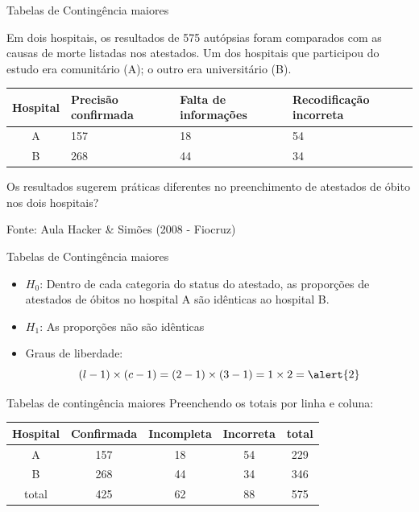 \documentclass{beamer}
\begin{document}
\begin{frame}{Tabelas de Contingência maiores}
  \begin{example}
    Em dois hospitais, os resultados de 575 autópsias
    foram comparados com as causas de morte listadas nos
    atestados. Um dos hospitais que participou do estudo era
    comunitário (A); o outro era universitário (B).

    \begin{tabular}{c|p{2cm}|p{2cm}|p{2cm}}
      Hospital & Precisão confirmada & Falta de informações &
      Recodificação incorreta \\
      \hline
      A & 157 & 18 & 54 \\
      \hline
      B & 268 & 44 & 34 \\
    \end{tabular}

    Os resultados sugerem práticas diferentes no preenchimento de
    atestados de óbito nos dois hospitais?
  \end{example}
  Fonte: Aula Hacker \& Simões (2008 - Fiocruz)
\end{frame}

\begin{frame}{Tabelas de Contingência maiores}
  \begin{itemize}
  \item $H_0$: Dentro de cada categoria do status do atestado, as
    proporções de atestados de óbitos no hospital A são idênticas ao
    hospital B.
  \item $H_1$: As proporções não são idênticas
  \item Graus de liberdade: 
    \begin{displaymath}
      (l -1)\times (c-1) = (2-1) \times (3-1)
      = 1 \times 2 = \alert{2}
    \end{displaymath}
  \end{itemize}
\end{frame}

\begin{frame}{Tabelas de contingência maiores}
  Preenchendo os totais por linha e coluna:
  \begin{example}
    \begin{tabular}{c|c|c|c|c}
      Hospital & Confirmada & Incompleta &
      Incorreta & total\\
      \hline
      A & 157 & 18 & 54 & 229\\
      \hline
      B & 268 & 44 & 34 & 346\\
      \hline
      total & 425 & 62 & 88 & 575\\
    \end{tabular}
  \end{example}
\end{frame}
\end{document}
